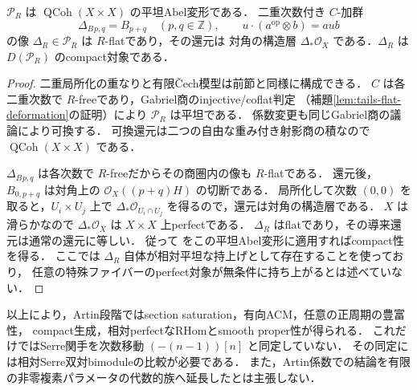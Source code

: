 \begin{lemma}[積の平坦変形と対角]
\label{lem:artin-product-diagonal}
$\mathcal P_R$ は $\operatorname{QCoh}(X\times X)$ の平坦Abel変形である．
二重次数付き $C$-加群
\[
 \Delta_B{}_{p,q}=B_{p+q}\quad(p,q\in\mathbb Z),\qquad
 u\cdot(a^{\mathrm{op}}\otimes b)=a u b
\]
の像 $\Delta_R\in\mathcal P_R$ は $R$-flatであり，その還元は
対角の構造層 $\Delta_*\mathcal O_X$ である．$\Delta_R$ は $D(\mathcal P_R)$ のcompact対象である．
\end{lemma}
\begin{proof}
二重局所化の重なりと有限\v{C}ech模型は前節と同様に構成できる．
$C$ は各二重次数で $R$-freeであり，Gabriel商のinjective/coflat判定
（補題\ref{lem:tails-flat-deformation}の証明）により $\mathcal P_R$ は平坦である．
係数変更も同じGabriel商の議論により可換する．
可換還元は二つの自由な重み付き射影商の積なので $\operatorname{QCoh}(X\times X)$ である．

$\Delta_B{}_{p,q}$ は各次数で $R$-freeだからその商圏内の像も $R$-flatである．
還元後，$B_{0,p+q}$ は対角上の $\mathcal O_X((p+q)H)$ の切断である．
局所化して次数 $(0,0)$ を取ると，$U_i\times U_j$ 上で
$\Delta_*\mathcal O_{U_i\cap U_j}$ を得るので，還元は対角の構造層である．
$X$ は滑らかなので $\Delta_*\mathcal O_X$ は $X\times X$ 上perfectである．
$\Delta_R$ はflatであり，その導来還元は通常の還元に等しい．
従って \cite[Proposition~5.8]{DDL2011} をこの平坦Abel変形に適用すればcompact性を得る．
ここでは $\Delta_R$ 自体が相対平坦な持上げとして存在することを使っており，
任意の特殊ファイバーのperfect対象が無条件に持ち上がるとは述べていない．
\end{proof}


\begin{remark}[相対Serre公式との役割分担]
以上により，Artin段階ではsection saturation，有向ACM，任意の正周期の豊富性，
compact生成，相対perfectなRHomとsmooth proper性が得られる．
これだけではSerre関手を次数移動 $(-(n-1))[n]$ と同定していない．
その同定には相対Serre双対bimoduleの比較が必要である．
また，Artin係数での結論を有限の非零複素パラメータの代数的族へ延長したとは主張しない．
\end{remark}
